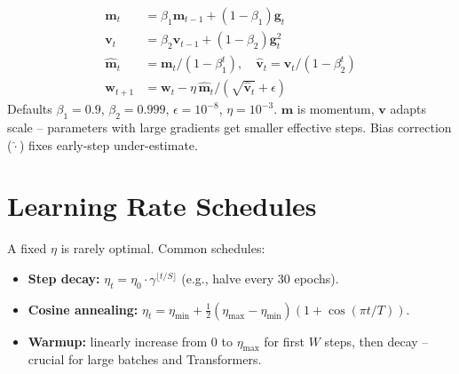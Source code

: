 \begin{equation}
\begin{aligned}
\mathbf{m}_t &= \beta_1\mathbf{m}_{t-1}+(1-\beta_1)\mathbf{g}_t\\
\mathbf{v}_t &= \beta_2\mathbf{v}_{t-1}+(1-\beta_2)\mathbf{g}_t^2\\
\hat{\mathbf{m}}_t&=\mathbf{m}_t/(1-\beta_1^t),\quad \hat{\mathbf{v}}_t=\mathbf{v}_t/(1-\beta_2^t)\\
\mathbf{w}_{t+1}&=\mathbf{w}_t-\eta\,\hat{\mathbf{m}}_t/(\sqrt{\hat{\mathbf{v}}_t}+\epsilon)
\end{aligned}
\end{equation}
Defaults $\beta_1=0.9$, $\beta_2=0.999$, $\epsilon=10^{-8}$, $\eta=10^{-3}$. $\mathbf{m}$ is momentum, $\mathbf{v}$ adapts scale -- parameters with large gradients get smaller effective steps. Bias correction ($\hat{\cdot}$) fixes early-step under-estimate.

\section{Learning Rate Schedules}
A fixed $\eta$ is rarely optimal. Common schedules:
\begin{itemize}
\item \textbf{Step decay:} $\eta_t=\eta_0\cdot\gamma^{\lfloor t/S\rfloor}$ (e.g., halve every 30 epochs).
\item \textbf{Cosine annealing:} $\eta_t=\eta_{\min}+\tfrac12(\eta_{\max}-\eta_{\min})(1+\cos(\pi t/T))$.
\item \textbf{Warmup:} linearly increase from $0$ to $\eta_{\max}$ for first $W$ steps, then decay -- crucial for large batches and Transformers.
\end{itemize}

\begin{center}
\end{center}

